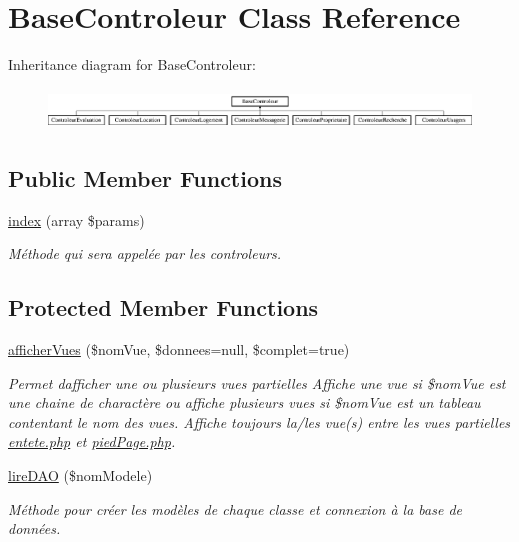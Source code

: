 \hypertarget{class_base_controleur}{}\section{Base\+Controleur Class Reference}
\label{class_base_controleur}
Inheritance diagram for Base\+Controleur\+:\begin{figure}[H]
\begin{center}
\leavevmode
\includegraphics[height=1.088435cm]{class_base_controleur}
\end{center}
\end{figure}
\subsection*{Public Member Functions}
\begin{DoxyCompactItemize}
\item 
\hyperlink{class_base_controleur_a7af2cca7fd2a055d0e825c26a75e7e45}{index} (array \$params)
\begin{DoxyCompactList}\small\item\em Méthode qui sera appelée par les controleurs. \end{DoxyCompactList}\end{DoxyCompactItemize}
\subsection*{Protected Member Functions}
\begin{DoxyCompactItemize}
\item 
\hyperlink{class_base_controleur_a5f865fc7aa819664eec62f5dbd0cd8f2}{afficher\+Vues} (\$nom\+Vue, \$donnees=null, \$complet=true)
\begin{DoxyCompactList}\small\item\em Permet d\textquotesingle{}afficher une ou plusieurs vues partielles  Affiche une vue si \$nom\+Vue est une chaine de charactère ou affiche plusieurs vues si \$nom\+Vue est un tableau contentant le nom des vues. Affiche toujours la/les vue(s) entre les vues partielles \hyperlink{entete_8php}{entete.\+php} et \hyperlink{pied_page_8php}{pied\+Page.\+php}. \end{DoxyCompactList}\item 
\hyperlink{class_base_controleur_a69ec4d8d399883fc3335422053791cdb}{lire\+D\+AO} (\$nom\+Modele)
\begin{DoxyCompactList}\small\item\em Méthode pour créer les modèles de chaque classe et connexion à la base de données. \end{DoxyCompactList}\end{DoxyCompactItemize}


